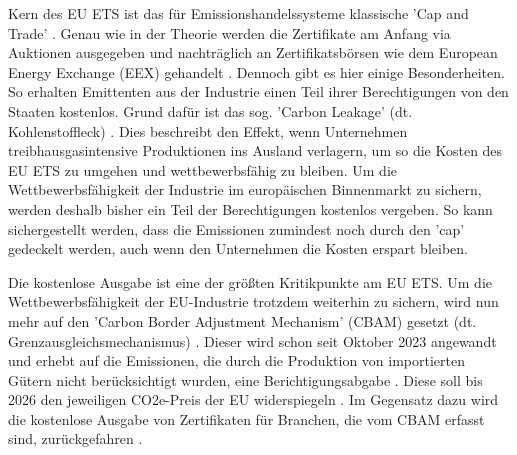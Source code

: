 Kern des EU ETS ist das für Emissionshandelssysteme klassische 'Cap and Trade' \cite{eu.2023}. Genau wie in der Theorie werden die Zertifikate am Anfang via Auktionen ausgegeben und nachträglich an Zertifikatsbörsen wie dem European Energy Exchange (EEX) gehandelt \cite[S. 186]{hubert.2020} .
Dennoch gibt es hier einige Besonderheiten. So erhalten Emittenten aus der Industrie einen Teil ihrer Berechtigungen von den Staaten kostenlos.
Grund dafür ist das sog. 'Carbon Leakage' (dt. Kohlenstoffleck) \cite{eu2.2023}.
Dies beschreibt den Effekt, wenn Unternehmen treibhausgasintensive Produktionen ins Ausland verlagern, um so die Kosten des EU ETS zu umgehen und wettbewerbsfähig zu bleiben.
Um die Wettbewerbsfähigkeit der Industrie im europäischen Binnenmarkt zu sichern, werden deshalb bisher ein Teil der Berechtigungen kostenlos vergeben.
So kann sichergestellt werden, dass die Emissionen zumindest noch durch den 'cap' gedeckelt werden, auch wenn den Unternehmen die Kosten erspart bleiben.

Die kostenlose Ausgabe ist eine der größten Kritikpunkte am EU ETS. Um die Wettbewerbsfähigkeit der EU-Industrie trotzdem weiterhin zu sichern, wird nun mehr auf den 'Carbon Border Adjustment Mechanism' (CBAM) gesetzt (dt. Grenzausgleichsmechanismus) \cite{ub.2023}.
Dieser wird schon seit Oktober 2023 angewandt und erhebt auf die Emissionen, die durch die Produktion von importierten Gütern nicht berücksichtigt wurden, eine Berichtigungsabgabe \cite{ub2.2023}.
Diese soll bis 2026 den jeweiligen CO2e-Preis der EU widerspiegeln \cite{ub.2023}.
Im Gegensatz dazu wird die kostenlose Ausgabe von Zertifikaten für Branchen, die vom CBAM erfasst sind, zurückgefahren \cite{ub.2023}.

